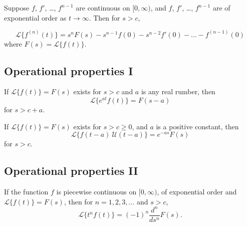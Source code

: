 \documentclass{article}
\begin{document}
\begin{thm}  
    Suppose \(f\), \(f'\), \ldots, \(f^{n-1}\) are continuous on \([0, \infty)\), and \(f\), \(f'\), \ldots, \(f^{n-1}\) are of exponential order as \(t \to \infty\). Then for \(s > c\),
    
    \begin{equation}
        \mathcal{L} \{f^{(n)}(t)\} = s^n F(s) - s^{n-1} f(0) - s^{n-2} f'(0) - \ldots - f^{(n-1)}(0)
    \end{equation}
    where \(F(s) = \mathcal{L} \{f(t)\}\).
\end{thm}

\subsection{Operational properties I}

\begin{thm} 
    If \(\mathcal{L} \{f(t)\} = F(s)\) exists for \(s > c\) and \(a\) is any real rumber, then
    \begin{equation}
        \mathcal{L} \{e^{at} f(t)\} = F(s-a)
    \end{equation}
    for \(s > c + a\).
\end{thm}

\begin{thm} 
    If \(\mathcal{L} \{f(t)\} = F(s)\) exists for \(s > c \geq 0\), and \(a\) is a positive constant, then
    \begin{equation}
        \mathcal{L} \{f(t-a)\ \mathcal{U}(t-a)\} = e^{-as}F(s)
    \end{equation}
    for \(s > c\).
\end{thm}

\subsection{Operational properties II}

\begin{thm} 
    If the function \(f\) is piecewise continuous on \([0,\infty)\), of exponential order and \(\mathcal{L} \{f(t)\} = F(s)\), then for \(n = 1, 2, 3, \ldots\) and \(s > c\),
    \begin{equation}
        \mathcal{L} \{t^n f(t)\} = (-1)^n\frac{d^n}{ds^n} F(s).
    \end{equation}
\end{thm}
\end{document}
